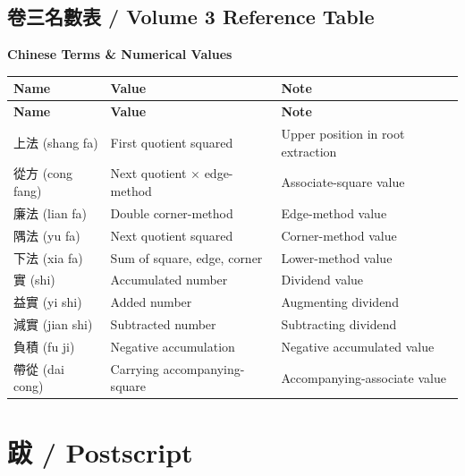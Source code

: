 \documentclass[11pt,a4paper]{article}
\begin{document}
\subsection*{卷三名數表 / Volume 3 Reference Table}

\begin{center}
\textbf{Chinese Terms \& Numerical Values}
\end{center}

\begin{center}
\begin{longtable}{|l|l|l|}
\hline
\textbf{Name} & \textbf{Value} & \textbf{Note} \\
\hline
\endfirsthead
\hline
\textbf{Name} & \textbf{Value} & \textbf{Note} \\
\hline
\endhead
上法 (shang fa) & First quotient squared & Upper position in root extraction \\
\hline
從方 (cong fang) & Next quotient $\times$ edge-method & Associate-square value \\
\hline
廉法 (lian fa) & Double corner-method & Edge-method value \\
\hline
隅法 (yu fa) & Next quotient squared & Corner-method value \\
\hline
下法 (xia fa) & Sum of square, edge, corner & Lower-method value \\
\hline
實 (shi) & Accumulated number & Dividend value \\
\hline
益實 (yi shi) & Added number & Augmenting dividend \\
\hline
減實 (jian shi) & Subtracted number & Subtracting dividend \\
\hline
負積 (fu ji) & Negative accumulation & Negative accumulated value \\
\hline
帶從 (dai cong) & Carrying accompanying-square & Accompanying-associate value \\
\hline
\end{longtable}
\end{center}

\clearpage

\section*{跋 / Postscript}
\end{document}
